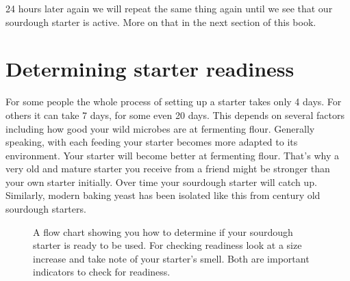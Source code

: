24 hours later again we will repeat the same thing again until
we see that our sourdough starter is active. More on that in the
next section of this book.

\section{Determining starter readiness}

For some people the whole process of setting up a starter takes
only 4 days. For others it can take 7 days, for some even 20 days.
This depends on several factors including how good your wild microbes
are at fermenting flour. Generally speaking, with each feeding
your starter becomes more adapted to its environment. Your
starter will become better at fermenting flour. That's why
a very old and mature starter you receive from a friend might
be stronger than your own starter initially. Over time
your sourdough starter will catch up. Similarly, modern baking
yeast has been isolated like this from century old sourdough
starters.

\begin{figure}[!htb]
\begin{center}
  
  \caption{A flow chart showing you how to determine if your sourdough starter is ready to be used.
  For checking readiness look at a size increase and take note of your starter's smell. Both are important
  indicators to check for readiness.}%
  \label{fig:sourdough-starter-readiness}
\end{center}
\end{figure}

